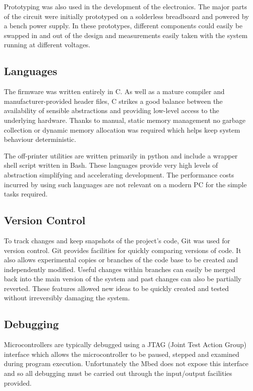 			Prototyping was also used in the development of the electronics. The major
			parts of the circuit were initially prototyped on a solderless breadboard
			and powered by a bench power supply. In these prototypes, different
			components could easily be swapped in and out of the design and
			measurements easily taken with the system running at different voltages.
		
		\subsection{Languages}
			
			The firmware was written entirely in C. As well as a mature compiler and
			manufacturer-provided header files, C strikes a good balance between the
			availability of sensible abstractions and providing low-level access to
			the underlying hardware. Thanks to manual, static memory management no
			garbage collection or dynamic memory allocation was required which helps
			keep system behaviour deterministic.
			
			The off-printer utilities are written primarily in python and include a
			wrapper shell script written in Bash. These languages provide very high
			levels of abstraction simplifying and accelerating development. The
			performance costs incurred by using such languages are not relevant on a
			modern PC for the simple tasks required.
			
		\subsection{Version Control}
			
			To track changes and keep snapshots of the project's code, Git was used
			for version control. Git provides facilities for quickly comparing
			versions of code. It also allows experimental copies or branches of the
			code base to be created and independently modified. Useful changes within
			branches can easily be merged back into the main version of the system and
			past changes can also be partially reverted. These features allowed new
			ideas to be quickly created and tested without irreversibly damaging the
			system.
		
		\subsection{Debugging}
			
			Microcontrollers are typically debugged using a JTAG (Joint Test Action
			Group) interface which allows the microcontroller to be paused, stepped
			and examined during program execution. Unfortunately the Mbed does not
			expose this interface and so all debugging must be carried out through the
			input/output facilities provided.
			
